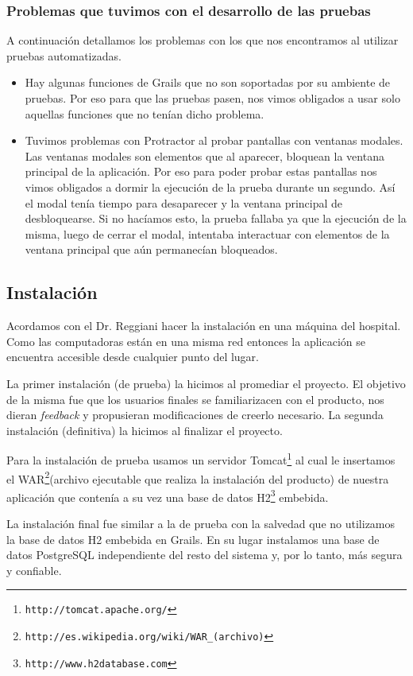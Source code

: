 \subsubsection{Problemas que tuvimos con el desarrollo de las pruebas}
A continuación detallamos los problemas con los que nos encontramos al utilizar pruebas automatizadas.
\begin{itemize}
\item Hay algunas funciones de Grails que no son soportadas por su ambiente de pruebas. Por eso para que las pruebas pasen, nos vimos obligados a usar solo aquellas funciones que no tenían dicho problema.
\item Tuvimos problemas con Protractor al probar pantallas con ventanas modales. Las ventanas modales son elementos que al aparecer, bloquean la ventana principal de la aplicación. Por eso para poder probar estas pantallas nos vimos obligados a dormir la ejecución de la prueba durante un segundo. Así el modal tenía tiempo para desaparecer y la ventana principal de desbloquearse. Si no hacíamos esto, la prueba fallaba ya que la ejecución de la misma, luego de cerrar el modal, intentaba interactuar con elementos de la ventana principal que aún permanecían bloqueados.
\end{itemize}

\subsection{Instalación}
Acordamos con el Dr. Reggiani hacer la instalación en una máquina del hospital. Como las computadoras están en una misma red entonces la aplicación se encuentra accesible desde cualquier punto del lugar.

La primer instalación (de prueba) la hicimos al promediar el proyecto. El objetivo de la misma fue que los usuarios finales se familiarizacen con el producto, nos dieran \textit{feedback} y propusieran modificaciones de creerlo necesario. La segunda instalación (definitiva) la hicimos al finalizar el proyecto.

Para la instalación de prueba usamos un servidor Tomcat\footnote{\texttt{http://tomcat.apache.org/}} al cual le insertamos el WAR\footnote{\texttt{http://es.wikipedia.org/wiki/WAR\_(archivo)}}(archivo ejecutable que realiza la instalación del producto) de nuestra aplicación que contenía a su vez una base de datos H2\footnote{\texttt{http://www.h2database.com}} embebida.

La instalación final fue similar a la de prueba con la salvedad que no utilizamos la base de datos H2 embebida en Grails. En su lugar instalamos una base de datos PostgreSQL independiente del resto del sistema y, por lo tanto, más segura y confiable.